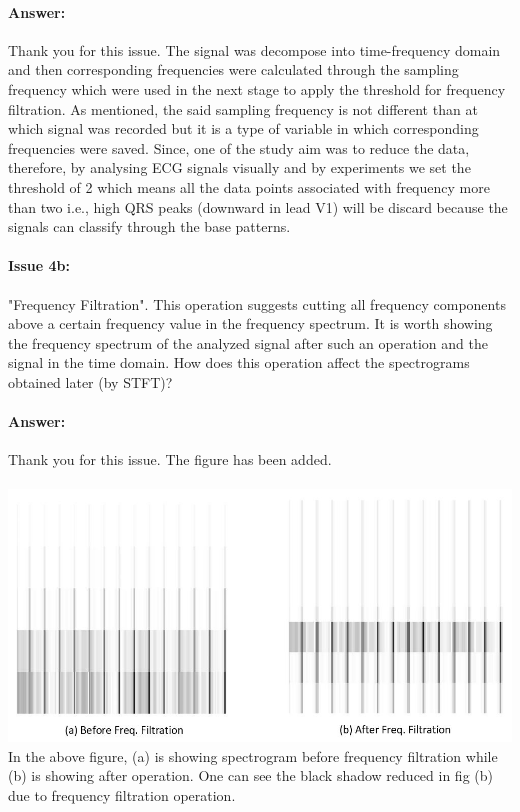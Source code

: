 \documentclass{article}
\begin{document}
\paragraph{Answer:}
Thank you for this issue. The signal was decompose into time-frequency domain and then corresponding frequencies were calculated through the sampling frequency  which were used in the next stage to apply the threshold for frequency filtration.  As mentioned, the said sampling frequency is not different than at which signal was recorded but it is a type of variable in which corresponding frequencies were saved. Since, one of the study aim was to reduce the data, therefore, by analysing ECG signals visually and by experiments we set the threshold of 2 which means all the data points associated with frequency more than two i.e., high QRS peaks (downward in lead V1) will be discard because the signals can classify through the base patterns. 

\paragraph{Issue 4b:}
\begin{displayquote}
"Frequency Filtration". This operation suggests cutting all frequency components above a certain frequency value in the frequency spectrum. It is worth showing the frequency spectrum of the analyzed signal after such an operation and the signal in the time domain. How does this operation affect the spectrograms obtained later (by STFT)?
\end{displayquote}
\paragraph{Answer:}
Thank you for this issue. The figure has been added.\\\\
\includegraphics[scale=0.5]{before and after spectrogram.JPG}\\
In the above figure, (a) is showing spectrogram before frequency filtration while (b) is showing after operation. One can see the black shadow reduced in fig (b) due to frequency filtration operation. \\\\
\end{document}
